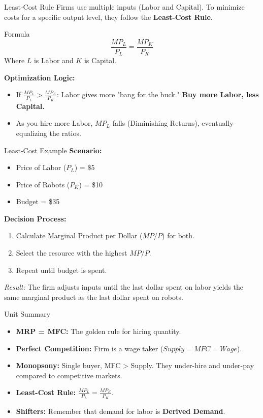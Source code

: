 \documentclass[aspectratio=169]{beamer}
\begin{document}
\begin{frame}{Least-Cost Rule}
    Firms use multiple inputs (Labor and Capital). To minimize costs for a specific output level, they follow the \textbf{Least-Cost Rule}.
    
    \begin{block}{Formula}
        \[ \frac{MP_L}{P_L} = \frac{MP_K}{P_K} \]
        \small{Where $L$ is Labor and $K$ is Capital.}
    \end{block}
    
    \textbf{Optimization Logic:}
    \begin{itemize}
        \item If $\frac{MP_L}{P_L} > \frac{MP_K}{P_K}$: Labor gives more "bang for the buck." \textbf{Buy more Labor, less Capital.}
        \item As you hire more Labor, $MP_L$ falls (Diminishing Returns), eventually equalizing the ratios.
    \end{itemize}
\end{frame}

\begin{frame}{Least-Cost Example}
    \textbf{Scenario:}
    \begin{itemize}
        \item Price of Labor ($P_L$) = \$5
        \item Price of Robots ($P_K$) = \$10
        \item Budget = \$35
    \end{itemize}

    \textbf{Decision Process:}
    \begin{enumerate}
        \item Calculate Marginal Product per Dollar ($MP/P$) for both.
        \item Select the resource with the highest $MP/P$.
        \item Repeat until budget is spent.
    \end{enumerate}
    
    \vspace{0.2cm}
    \textit{Result:} The firm adjusts inputs until the last dollar spent on labor yields the same marginal product as the last dollar spent on robots.
\end{frame}

\begin{frame}{Unit Summary}
    \begin{itemize}
        \item \textbf{MRP = MFC:} The golden rule for hiring quantity.
        \item \textbf{Perfect Competition:} Firm is a wage taker ($Supply = MFC = Wage$).
        \item \textbf{Monopsony:} Single buyer, MFC > Supply. They under-hire and under-pay compared to competitive markets.
        \item \textbf{Least-Cost Rule:} $\frac{MP_L}{P_L} = \frac{MP_K}{P_K}$.
        \item \textbf{Shifters:} Remember that demand for labor is \textbf{Derived Demand}.
    \end{itemize}
\end{frame}
\end{document}
